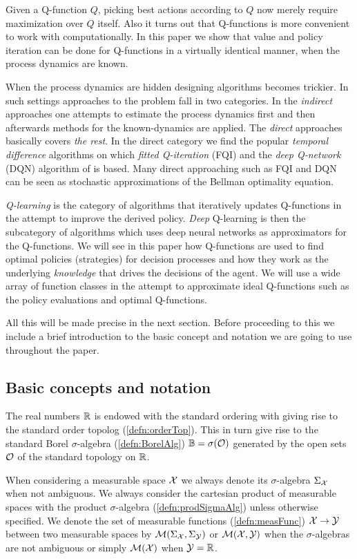 Given a Q-function $Q$, picking best actions according to $Q$ now
merely require maximization over $Q$ itself.
Also it turns out that Q-functions is
more convenient to work with computationally.
In this paper we show that value and policy iteration can be done
for Q-functions in a virtually identical manner, when the process dynamics
are known.

When the process dynamics are hidden designing algorithms becomes trickier.
In such settings approaches to the problem
fall in two categories. In the \emph{indirect} approaches
one attempts to estimate the process dynamics first and then afterwards
methods for the known-dynamics are applied.
The \emph{direct} approaches basically covers \emph{the rest}.
In the direct category we find the popular \emph{temporal difference}
algorithms on which \emph{fitted Q-iteration} (FQI)
and the \emph{deep Q-network} (DQN) algorithm of  is based.
Many direct approaching such as FQI and DQN can be seen as
stochastic approximations of the Bellman optimality equation.

\emph{Q-learning} is the category of algorithms that iteratively updates
Q-functions in the attempt to improve the derived policy.
\emph{Deep} Q-learning is then the subcategory of algorithms which
uses deep neural networks as approximators for the Q-functions.
We will see in this paper how Q-functions are used to find optimal
policies (strategies) for decision processes and how they work
as the underlying \emph{knowledge} that drives the decisions of
the agent. We will use a wide array of function classes in the attempt
to approximate ideal Q-functions such as the policy evaluations and
optimal Q-functions.

All this will be made precise in the next section.
Before proceeding to this we include a brief introduction to the basic
concept and notation we are going to use throughout the paper.

\subsection{Basic concepts and notation}

The real numbers $\mathbb{R}$ is endowed with
the standard ordering with
giving rise to the
standard order topolog
(\cref{defn:orderTop}).
This in turn give rise to the standard Borel $\sigma$-algebra
(\cref{defn:BorelAlg}) $\mathbb{B} = \sigma(\mathcal{O})$
generated by the open sets $\mathcal{O}$ of the standard topology on $\mathbb{R}$.

When considering a measurable space $\mathcal{X}$ 
we always denote its $\sigma$-algebra
$\Sigma_\mathcal{X}$ when not ambiguous.
We always
consider the cartesian product of measurable spaces
with the product $\sigma$-algebra (\cref{defn:prodSigmaAlg})
unless otherwise specified.
We denote the set of measurable functions (\cref{defn:measFunc})
$\mathcal{X} \to \mathcal{Y}$ between two measurable spaces by 
$\mathcal{M}(\Sigma_\mathcal{X}, \Sigma_\mathcal{Y})$ or $\mathcal{M}(\mathcal{X}, \mathcal{Y})$
when the $\sigma$-algebras are not ambiguous
or simply $\mathcal{M}(\mathcal{X})$ when $\mathcal{Y} = \mathbb{R}$.


